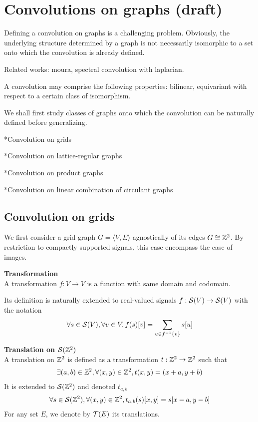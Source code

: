\section{Convolutions on graphs (draft)}

Defining a convolution on graphs is a challenging problem. Obviously, the underlying structure determined by a graph is not necessarily isomorphic to a set onto which the convolution is already defined. 

Related works: moura, spectral convolution with laplacian.

A convolution may comprise the following properties: bilinear, equivariant with respect to a certain class of isomorphism.

We shall first study classes of graphs onto which the convolution can be naturally defined before generalizing.

*Convolution on grids

*Convolution on lattice-regular graphs

*Convolution on product graphs

*Convolution on linear combination of circulant graphs

\subsection{Convolution on grids}

We first consider a grid graph $G = \langle V,E \rangle$ agnostically of its edges \ie $G \cong \mathbb{Z}^2$. By restriction to compactly supported signals, this case encompass the case of images.

\begin{definition}\textbf{Transformation}\\
A transformation $f: V \rightarrow V$ is a function with same domain and codomain.

Its definition is naturally extended to real-valued signals $f: \mathcal{S}(V) \rightarrow \mathcal{S}(V)$ with the notation
\begin{gather*}
\forall s \in \mathcal{S}(V), \forall v \in V, f(s)[v] = \sum_{u \in f^{-1}\{v\}}{s[u]}
\end{gather*}
\end{definition}

\begin{definition}\textbf{Translation on $\mathcal{S}(\mathbb{Z}^2)$}\\
A translation on $\mathbb{Z}^2$ is defined as a transformation $t: \mathbb{Z}^2 \rightarrow \mathbb{Z}^2$ such that
\begin{gather*}
\exists (a,b) \in \mathbb{Z}^2, \forall (x,y) \in \mathbb{Z}^2, t(x,y) = (x+a,y+b)
\end{gather*}
It is extended to $\mathcal{S}(\mathbb{Z}^2)$ and denoted $t_{a,b}$ \ie
\begin{gather*}
\forall s \in \mathcal{S}(\mathbb{Z}^2), \forall (x,y) \in \mathbb{Z}^2, t_{a,b}(s)[x,y] = s[x-a, y-b]
\end{gather*}
For any set $E$, we denote by $\mathcal{T}(E)$ its translations.
\end{definition}

